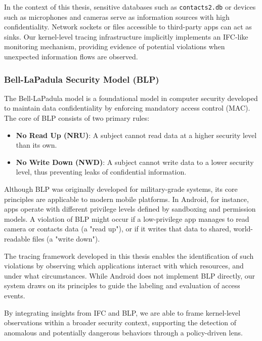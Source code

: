 \documentclass[a4paper,12pt]{report}
\begin{document}
In the context of this thesis, sensitive databases such as \texttt{contacts2.db} or devices such as microphones and cameras serve as information sources with high confidentiality. Network sockets or files accessible to third-party apps can act as sinks. Our kernel-level tracing infrastructure implicitly implements an IFC-like monitoring mechanism, providing evidence of potential violations when unexpected information flows are observed.

\subsubsection{Bell-LaPadula Security Model (BLP)}

The Bell-LaPadula model is a foundational model in computer security developed to maintain data confidentiality by enforcing mandatory access control (MAC). The core of BLP consists of two primary rules:

\begin{itemize}
    \item \textbf{No Read Up (NRU)}: A subject cannot read data at a higher security level than its own.
    \item \textbf{No Write Down (NWD)}: A subject cannot write data to a lower security level, thus preventing leaks of confidential information.
\end{itemize}

Although BLP was originally developed for military-grade systems, its core principles are applicable to modern mobile platforms. In Android, for instance, apps operate with different privilege levels defined by sandboxing and permission models. A violation of BLP might occur if a low-privilege app manages to read camera or contacts data (a "read up"), or if it writes that data to shared, world-readable files (a "write down").

The tracing framework developed in this thesis enables the identification of such violations by observing which applications interact with which resources, and under what circumstances. While Android does not implement BLP directly, our system draws on its principles to guide the labeling and evaluation of access events.

\bigskip

By integrating insights from IFC and BLP, we are able to frame kernel-level observations within a broader security context, supporting the detection of anomalous and potentially dangerous behaviors through a policy-driven lens.
\end{document}
